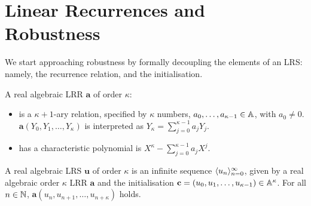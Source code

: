 \section{Linear Recurrences and Robustness}
\label{section:solspace}

We start approaching robustness by formally decoupling the elements of an LRS: namely, the recurrence relation, and the initialisation.

\begin{definition}
\label{def:LRR}
A real algebraic LRR $\mathbf{a}$ of order $\kappa$:
\begin{itemize}
\item is a $\kappa+1$-ary relation, specified by $\kappa$ numbers, $a_0, \dots, a_{\kappa-1} \in \mathbb{A}$, with $a_0 \ne 0$. $\mathbf{a}(Y_0, Y_1, \dots, Y_\kappa)$ is interpreted as 
$
Y_\kappa = \sum_{j=0}^{\kappa-1} a_j Y_j
$.
\item has a characteristic polynomial is
$
X^{\kappa} - \sum_{j=0}^{\kappa-1}a_j X^j
$.
\end{itemize}
\end{definition}

\begin{definition}
\label{def:LRS}
A real algebraic LRS $\mathbf{u}$ of order $\kappa$ is an infinite sequence $\langle u_n\rangle_{n=0}^\infty$, given by a real algebraic order $\kappa$ LRR $\mathbf{a}$ and the initialisation $\mathbf{c} = (u_0, u_1, \dots, u_{\kappa-1}) \in \mathbb{A}^\kappa$. For all $n \in \mathbb{N}$, $\mathbf{a}(u_n, u_{n+1}, \dots, u_{n+\kappa})$ holds.
\end{definition}

